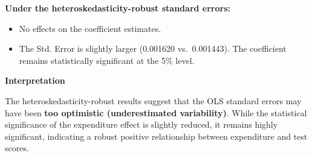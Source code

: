 \documentclass[
  12pt,
]{scrbook}
\providecommand{\tightlist}{%
  \setlength{\itemsep}{0pt}\setlength{\parskip}{0pt}}
\renewcommand{\tightlist}{\setlength{\itemsep}{0.5\baselineskip}\setlength{\parskip}{0.2\baselineskip}}
\theoremstyle{plain}
\theoremstyle{definition}
\theoremstyle{remark}
\begin{document}
\textbf{Under the heteroskedasticity-robust standard errors:}

\begin{itemize}
\tightlist
\item
  No effects on the coefficient estimates.
\item
  The Std. Error is slightly larger (0.001620 vs.~0.001443). The
  coefficient remains statistically significant at the 5\% level.
\end{itemize}

\textbf{Interpretation}

The heteroskedasticity-robust results suggest that the OLS standard
errors may have been {\textbf{too optimistic (underestimated
variability)}}. While the statistical significance of the expenditure
effect is slightly reduced, it remains highly significant, indicating a
robust positive relationship between expenditure and test scores.


\backmatter
\end{document}
